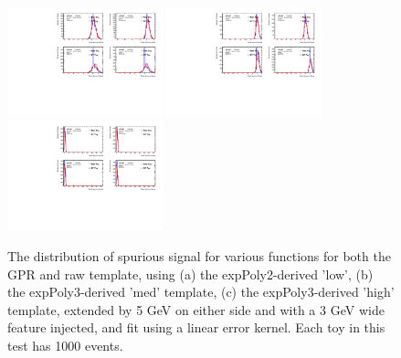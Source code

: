 \begin{figure} 
\begin{center}
  \includegraphics[width=0.4\textwidth]{figures/background/gpr/validation/linear/ToyTest_FitSigVals_lowpT_1000_Sig_1s}   
  \includegraphics[width=0.4\textwidth]{figures/background/gpr/validation/linear/ToyTest_FitSigVals_medpT_1000_Sig_1s}   
  \includegraphics[width=0.4\textwidth]{figures/background/gpr/validation/linear/ToyTest_FitSigVals_highpT_1000_Sig_1s}   
\caption{The distribution of spurious signal for various functions for both the GPR and raw template, using (a) the expPoly2-derived 'low', (b) the expPoly3-derived 'med' template, (c) the expPoly3-derived 'high' template, extended by 5 GeV on either side and with a 3 GeV wide feature injected, and fit using a linear error kernel. Each toy in this test has 1000 events.}
\label{fig:linearkernel_lowpt_1000_Sig_1s}
\end{center}
\end{figure}

